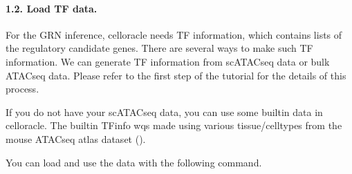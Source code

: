 \documentclass[letterpaper,10pt,english]{sphinxmanual}
\begin{document}
\paragraph{1.2. Load TF data.}
\label{\detokenize{notebooks/04_Network_analysis/Network_analysis_with_Paul_etal_2015_data:1.2.-Load-TF-data.}}
For the GRN inference, celloracle needs TF information, which contains lists of the regulatory candidate genes. There are several ways to make such TF information. We can generate TF information from scATAC\sphinxhyphen{}seq data or bulk ATAC\sphinxhyphen{}seq data. Please refer to the first step of the tutorial for the details of this process.

If you do not have your scATAC\sphinxhyphen{}seq data, you can use some built\sphinxhyphen{}in data in celloracle. The built\sphinxhyphen{}in TFinfo wqs made using various tissue/cell\sphinxhyphen{}types from the mouse ATAC\sphinxhyphen{}seq atlas dataset ().

You can load and use the data with the following command.

{
\begin{sphinxVerbatim}[commandchars=\\\{\}]
\llap{\color{nbsphinxin}[11]:\,\hspace{\fboxrule}\hspace{\fboxsep}}
  

\end{sphinxVerbatim}
}
\end{document}
